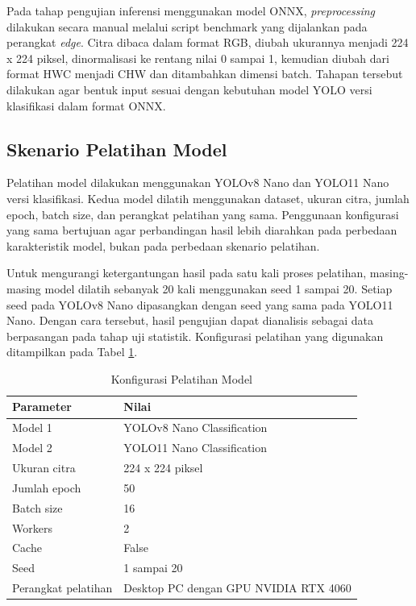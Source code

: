 \begin{sectioncontent}
\begin{subsectioncontent}
    Pada tahap pengujian inferensi menggunakan model ONNX, \textit{preprocessing} dilakukan secara manual melalui script benchmark yang dijalankan pada perangkat \textit{edge}. Citra dibaca dalam format RGB, diubah ukurannya menjadi 224 x 224 piksel, dinormalisasi ke rentang nilai 0 sampai 1, kemudian diubah dari format HWC menjadi CHW dan ditambahkan dimensi batch. Tahapan tersebut dilakukan agar bentuk input sesuai dengan kebutuhan model YOLO versi klasifikasi dalam format ONNX.
\end{subsectioncontent}

\subsection{Skenario Pelatihan Model}
\begin{subsectioncontent}
    \hspace{\parindent}Pelatihan model dilakukan menggunakan YOLOv8 Nano dan YOLO11 Nano versi klasifikasi. Kedua model dilatih menggunakan dataset, ukuran citra, jumlah epoch, batch size, dan perangkat pelatihan yang sama. Penggunaan konfigurasi yang sama bertujuan agar perbandingan hasil lebih diarahkan pada perbedaan karakteristik model, bukan pada perbedaan skenario pelatihan.

    Untuk mengurangi ketergantungan hasil pada satu kali proses pelatihan, masing-masing model dilatih sebanyak 20 kali menggunakan seed 1 sampai 20. Setiap seed pada YOLOv8 Nano dipasangkan dengan seed yang sama pada YOLO11 Nano. Dengan cara tersebut, hasil pengujian dapat dianalisis sebagai data berpasangan pada tahap uji statistik. Konfigurasi pelatihan yang digunakan ditampilkan pada Tabel \ref{tab:konfigurasi-pelatihan}.

    \begin{table}[H]
        \centering
        \caption{Konfigurasi Pelatihan Model}
        \label{tab:konfigurasi-pelatihan}
        \begin{tabular}{|l|l|}
            \hline
            \textbf{Parameter} & \textbf{Nilai} \\ \hline
                Model 1 & YOLOv8 Nano Classification \\ \hline
                Model 2 & YOLO11 Nano Classification \\ \hline
                Ukuran citra & 224 x 224 piksel \\ \hline
                Jumlah epoch & 50 \\ \hline
                Batch size & 16 \\ \hline
                Workers & 2 \\ \hline
                Cache & False \\ \hline
                Seed & 1 sampai 20 \\ \hline
                Perangkat pelatihan & Desktop PC dengan GPU NVIDIA RTX 4060 \\ \hline
        \end{tabular}
    \end{table}


\end{subsectioncontent}
\end{sectioncontent}
